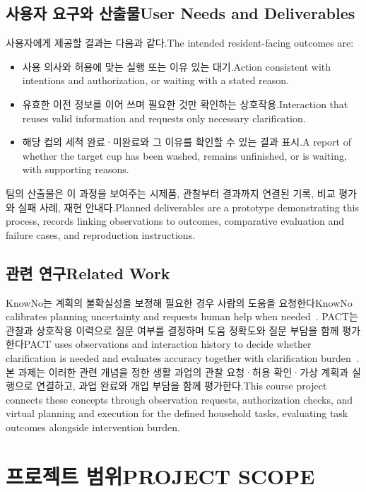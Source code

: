 \documentclass[conference,a4paper]{IEEEtran}
\newcommand{\bi}[2]{\ifKorean#1\else#2\fi}
\begin{document}
\subsection{\bi{사용자 요구와 산출물}{User Needs and Deliverables}}
\bi{사용자에게 제공할 결과는 다음과 같다.}{The intended resident-facing outcomes are:}
\begin{itemize}
\item \bi{사용 의사와 허용에 맞는 실행 또는 이유 있는 대기.}{Action consistent with intentions and authorization, or waiting with a stated reason.}
\item \bi{유효한 이전 정보를 이어 쓰며 필요한 것만 확인하는 상호작용.}{Interaction that reuses valid information and requests only necessary clarification.}
\item \bi{해당 컵의 세척 완료·미완료와 그 이유를 확인할 수 있는 결과 표시.}{A report of whether the target cup has been washed, remains unfinished, or is waiting, with supporting reasons.}
\end{itemize}
\bi{팀의 산출물은 이 과정을 보여주는 시제품, 관찰부터 결과까지 연결된 기록, 비교 평가와 실패 사례, 재현 안내다.}{Planned deliverables are a prototype demonstrating this process, records linking observations to outcomes, comparative evaluation and failure cases, and reproduction instructions.}

\subsection{\bi{관련 연구}{Related Work}}
\bi{KnowNo는 계획의 불확실성을 보정해 필요한 경우 사람의 도움을 요청한다}{KnowNo calibrates planning uncertainty and requests human help when needed}~\cite{knowno}.
\bi{PACT는 관찰과 상호작용 이력으로 질문 여부를 결정하며 도움 정확도와 질문 부담을 함께 평가한다}{PACT uses observations and interaction history to decide whether clarification is needed and evaluates accuracy together with clarification burden}~\cite{pact}.
\bi{본 과제는 이러한 관련 개념을 정한 생활 과업의 관찰 요청·허용 확인·가상 계획과 실행으로 연결하고, 과업 완료와 개입 부담을 함께 평가한다.}{This course project connects these concepts through observation requests, authorization checks, and virtual planning and execution for the defined household tasks, evaluating task outcomes alongside intervention burden.}

\section{\bi{프로젝트 범위}{PROJECT SCOPE}}
\end{document}
